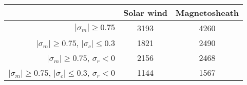 \begin{tabular}{rcc}
\hline
{} & Solar wind & Magnetosheath \\
\hline
$|\sigma_m|\geq 0.75$                        & 3193 & 4260  \\
$|\sigma_m|\geq 0.75$, $|\sigma_c|\leq 0.3$  & 1821 & 2490  \\
$|\sigma_m|\geq 0.75$, $\sigma_r<0$          & 2156 & 2468  \\
$|\sigma_m|\geq 0.75$, $|\sigma_c|\leq 0.3$, $\sigma_r<0$ & 1144 & 1567 \\
\hline
\end{tabular}
\label{tab:wavelet-event-summary}

